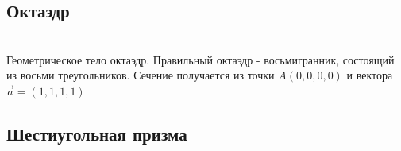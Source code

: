\documentclass[12pt, a4paper, twoside]{report}
\begin{document}
\subsection{Октаэдр}
\\
Геометрическое тело октаэдр.
Правильный октаэдр - восьмигранник, состоящий из восьми треугольников. Сечение получается из точки $A(0,0,0,0)$ и вектора $\overrightarrow a=(1,1,1,1)$
\subsection{Шестиугольная призма}
\\
\end{document}
